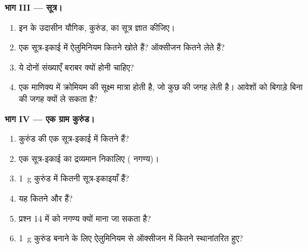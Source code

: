 \begin{problem}[{सप्ताहांत समस्या --- एक रत्न के पीछे के इलेक्ट्रॉन: दो विन्यासों से
एक ग्राम में स्थानांतरित इलेक्ट्रॉनों की संख्या तक}]
\medskip
\noindent\textbf{भाग III --- सूत्र।}
\begin{enumerate}[resume]
  \item इन  के उदासीन यौगिक, कुरुंड, का सूत्र ज्ञात कीजिए।
  \item एक सूत्र-इकाई में ऐलुमिनियम  कितने  खोते हैं? ऑक्सीजन
         कितने लेते हैं?
  \item ये दोनों संख्याएँ बराबर क्यों होनी चाहिए?
  \item एक माणिक्य में क्रोमियम   की सूक्ष्म मात्रा होती है, जो कुछ
          की जगह लेती है।   आवेशों को बिगाड़े बिना
          की जगह क्यों ले सकता है?
\end{enumerate}

\medskip
\noindent\textbf{भाग IV --- एक ग्राम कुरुंड।}
\begin{enumerate}[resume]
  \item कुरुंड की एक सूत्र-इकाई में कितने  हैं?
  \item एक सूत्र-इकाई का द्रव्यमान निकालिए ( नगण्य)।
  \item \qty{1}{g} कुरुंड में कितनी सूत्र-इकाइयाँ हैं?
  \item यह कितने   और   हैं?
  \item प्रश्न 14 में  को नगण्य क्यों माना जा सकता है?
  \item \qty{1}{g} कुरुंड बनाने के लिए ऐलुमिनियम से ऑक्सीजन में कितने 
        स्थानांतरित हुए?
\end{enumerate}
\end{problem}
